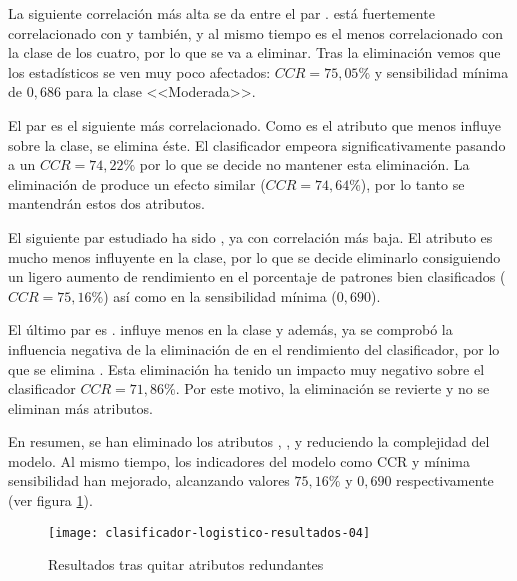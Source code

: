La siguiente correlación más alta se da entre el par .  está fuertemente correlacionado con  y  también, y al mismo tiempo es el menos correlacionado con la clase de los cuatro, por lo que se va a eliminar. Tras la eliminación vemos que los estadísticos se ven muy poco afectados: $CCR=75,05\%$ y sensibilidad mínima de $0,686$ para la clase <<Moderada>>.

El par  es el siguiente más correlacionado. Como  es el atributo que menos influye sobre la clase, se elimina éste. El clasificador empeora significativamente pasando a un $CCR=74,22\%$ por lo que se decide no mantener esta eliminación. La eliminación de  produce un efecto similar ($CCR=74,64\%$), por lo tanto se mantendrán estos dos atributos.

El siguiente par estudiado ha sido , ya con correlación más baja. El atributo  es mucho menos influyente en la clase, por lo que se decide eliminarlo consiguiendo un ligero aumento de rendimiento en el porcentaje de patrones bien clasificados ($CCR=75,16\%$) así como en la sensibilidad mínima ($0,690$).

El último par es .  influye menos en la clase y además, ya se comprobó la influencia negativa de la eliminación de  en el rendimiento del clasificador, por lo que se elimina . Esta eliminación ha tenido un impacto muy negativo sobre el clasificador $CCR=71,86\%$. Por este motivo, la eliminación se revierte y no se eliminan más atributos.

En resumen, se han eliminado los atributos , ,  y  reduciendo la complejidad del modelo. Al mismo tiempo, los indicadores del modelo como CCR y mínima sensibilidad han mejorado, alcanzando valores $75,16\%$ y $0,690$ respectivamente (ver figura \ref{fig:clasificador-logistico-resultados-04}).

\begin{figure}[ht]
    \centering
    \texttt{[image: clasificador-logistico-resultados-04]}
    \caption{Resultados tras quitar atributos redundantes}
    \label{fig:clasificador-logistico-resultados-04}
\end{figure}


